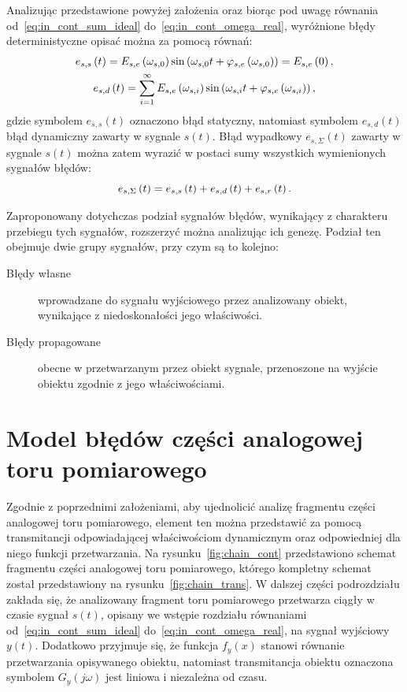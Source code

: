 Analizując przedstawione powyżej założenia oraz biorąc pod uwagę równania od~\eqref{eq:in_cont_sum_ideal} do~\eqref{eq:in_cont_omega_real}, wyróżnione błędy deterministyczne opisać można za pomocą równań:
\begin{gather}
e_{s,s} \left(t\right) = E_{s,e} \left(\omega_{s,0}\right) \sin \left( \omega_{s,0} t + \varphi_{s,e} \left(\omega_{s,0}\right) \right) = E_{s,e} \left(0\right) \label{eq:in_cont_err_stat}, \\
e_{s,d} \left(t\right) = \sum _{i = 1} ^{\infty} E_{s,e} \left(\omega_{s,i}\right) \sin \left( \omega_{s,i} t + \varphi_{s,e} \left(\omega_{s,i}\right) \right) \label{eq:in_cont_err_dyn},
\end{gather}
gdzie symbolem $e_{s,s}(t)$ oznaczono błąd statyczny, natomiast symbolem $e_{s,d}(t)$ błąd dynamiczny zawarty w sygnale $s(t)$. Błąd wypadkowy $e_{s,\Sigma}(t)$ zawarty w sygnale $s(t)$ można zatem wyrazić w postaci sumy wszystkich wymienionych sygnałów błędów:
\begin{equation}
e_{s,\Sigma} \left(t\right) = e_{s,s} \left(t\right) + e_{s,d} \left(t\right) + e_{s,r} \left(t\right) \label{eq:in_cont_err_sum}.
\end{equation}

Zaproponowany dotychczas podział sygnałów błędów, wynikający z charakteru przebiegu tych sygnałów, rozszerzyć można analizując ich genezę. Podział ten obejmuje dwie grupy sygnałów, przy czym są to kolejno:
\begin{description}
\item [Błędy własne] wprowadzane do sygnału wyjściowego przez analizowany obiekt, wynikające z niedoskonałości jego właściwości.
\item [Błędy propagowane] obecne w przetwarzanym przez obiekt sygnale, przenoszone na wyjście obiektu zgodnie z jego właściwościami.
\end{description}

\section{Model błędów części analogowej toru pomiarowego}

Zgodnie z poprzednimi założeniami, aby ujednolicić analizę fragmentu części analogowej toru pomiarowego, element ten można przedstawić za pomocą transmitancji odpowiadającej właściwościom dynamicznym oraz odpowiedniej dla niego funkcji przetwarzania. Na rysunku~\ref{fig:chain_cont} przedstawiono schemat fragmentu części analogowej toru pomiarowego, którego kompletny schemat został przedstawiony na rysunku~\ref{fig:chain_trans}. W dalszej części podrozdziału zakłada się, że analizowany fragment toru pomiarowego przetwarza ciągły w czasie sygnał $s(t)$, opisany we wstępie rozdziału równaniami od~\eqref{eq:in_cont_sum_ideal} do~\eqref{eq:in_cont_omega_real}, na sygnał wyjściowy $y(t)$. Dodatkowo przyjmuje się, że funkcja $f_{y}(x)$ stanowi równanie przetwarzania opisywanego obiektu, natomiast transmitancja obiektu oznaczona symbolem $G_{y}(j\omega)$ jest liniowa i niezależna od czasu.

